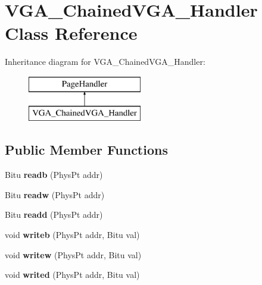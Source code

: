 \hypertarget{classVGA__ChainedVGA__Handler}{\section{V\-G\-A\-\_\-\-Chained\-V\-G\-A\-\_\-\-Handler Class Reference}
\label{classVGA__ChainedVGA__Handler}
}
Inheritance diagram for V\-G\-A\-\_\-\-Chained\-V\-G\-A\-\_\-\-Handler\-:\begin{figure}[H]
\begin{center}
\leavevmode
\includegraphics[height=2.000000cm]{classVGA__ChainedVGA__Handler}
\end{center}
\end{figure}
\subsection*{Public Member Functions}
\begin{DoxyCompactItemize}
\item 
\hypertarget{classVGA__ChainedVGA__Handler_aea83dd70eea349badfbb9726325468da}{Bitu {\bfseries readb} (Phys\-Pt addr)}\label{classVGA__ChainedVGA__Handler_aea83dd70eea349badfbb9726325468da}

\item 
\hypertarget{classVGA__ChainedVGA__Handler_a196cc140efeec310044150f89ca6d96a}{Bitu {\bfseries readw} (Phys\-Pt addr)}\label{classVGA__ChainedVGA__Handler_a196cc140efeec310044150f89ca6d96a}

\item 
\hypertarget{classVGA__ChainedVGA__Handler_a92c78a408e03dd4455629741080c14d6}{Bitu {\bfseries readd} (Phys\-Pt addr)}\label{classVGA__ChainedVGA__Handler_a92c78a408e03dd4455629741080c14d6}

\item 
\hypertarget{classVGA__ChainedVGA__Handler_a010ea22f621677ea02d6ca58b14bbbe4}{void {\bfseries writeb} (Phys\-Pt addr, Bitu val)}\label{classVGA__ChainedVGA__Handler_a010ea22f621677ea02d6ca58b14bbbe4}

\item 
\hypertarget{classVGA__ChainedVGA__Handler_a02f8817a49157a1c597a39e2eb687e53}{void {\bfseries writew} (Phys\-Pt addr, Bitu val)}\label{classVGA__ChainedVGA__Handler_a02f8817a49157a1c597a39e2eb687e53}

\item 
\hypertarget{classVGA__ChainedVGA__Handler_a5ff1e306a4ec65b07423ba45cbb89679}{void {\bfseries writed} (Phys\-Pt addr, Bitu val)}\label{classVGA__ChainedVGA__Handler_a5ff1e306a4ec65b07423ba45cbb89679}

\end{DoxyCompactItemize}
